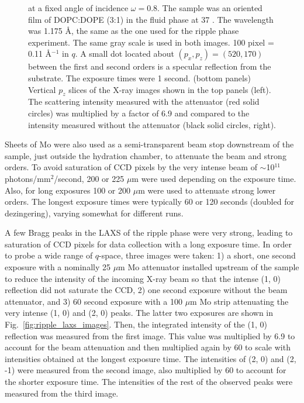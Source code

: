 \begin{figure}[jtbp]
{  at a fixed angle of incidence $\omega=0.8$\textdegree. The sample was an oriented film of 
  DOPC:DOPE (3:1) in the fluid phase at 37 \textcelsius. The wavelength
  was 1.175 \AA, the same as the one used for the ripple phase experiment.
  The same gray scale is used in both images. 100 pixel =  0.11 \AA$^{-1}$ in $q$. 
  A small dot located about $(p_x,p_z)=(520,170)$ between the first and second orders is 
  a specular reflection from the substrate. The exposure times were 1 second. 
  (bottom panels) Vertical $p_z$ slices of the X-ray images shown in the top panels (left).
  The scattering intensity measured with the attenuator (red solid circles) 
  was multiplied by a factor of 6.9 and compared to the intensity measured 
  without the attenuator (black solid circles, right).}
  \label{fig:olddopc}
\end{figure}

Sheets of Mo were also used as a semi-transparent beam stop downstream of the 
sample, just 
outside the hydration chamber, to attenuate the beam and strong orders.
To avoid saturation of CCD pixels by
the very intense beam of $\sim$10$^{11}$ photons/mm$^2$/second, 200 or 225 $\mu$m 
were used depending on the exposure time.  Also, for long exposures 100 or 200 
$\mu$m were used to attenuate strong lower orders.  The longest exposure times 
were typically 60 or 120 seconds (doubled for dezingering), varying somewhat for 
different runs.

A few Bragg peaks in the LAXS of the ripple phase
were very strong, leading to saturation of CCD pixels for data collection
with a long exposure time. 
In order to probe a wide range of $q$-space, three images were taken:
1) a short, one second exposure with a nominally 25 $\mu$m
Mo attenuator installed upstream of the sample to reduce the 
intensity
of the incoming X-ray beam so that the intense (1, 0)
reflection did not 
saturate the CCD, 2) one second exposure without the beam attenuator,
and 3) 60 second exposure with a 100 $\mu$m Mo strip attenuating the very 
intense 
(1, 0) and (2, 0) peaks. 
The latter two exposures are shown in 
Fig.~\ref{fig:ripple_laxs_images}. 
Then, the integrated intensity of the (1, 0) 
reflection was measured
from the first image. This value was multiplied by 6.9 to account for the beam
attenuation and then multiplied again by 60 to scale with intensities obtained 
at the longest exposure time. 
The intensities of (2, 0) and 
(2, -1) were measured from the second image, also
multiplied by 60 to account for the shorter exposure time. The intensities of
the rest of the observed peaks were measured from the third image.

